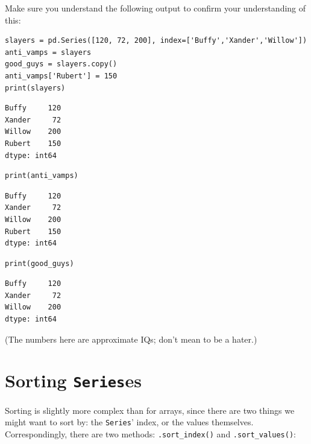 Make sure you understand the following output to confirm your understanding of
this:


\begin{Verbatim}[fontsize=\scriptsize,samepage=true,frame=single,framesep=3mm]
slayers = pd.Series([120, 72, 200], index=['Buffy','Xander','Willow'])
anti_vamps = slayers
good_guys = slayers.copy()
anti_vamps['Rubert'] = 150
print(slayers)
\end{Verbatim}
\vspace{-.3in}

\begin{Verbatim}[fontsize=\scriptsize,samepage=true,frame=leftline,framesep=5mm,framerule=1mm]
Buffy     120
Xander     72
Willow    200
Rubert    150
dtype: int64
\end{Verbatim}

\begin{Verbatim}[fontsize=\scriptsize,samepage=true,frame=single,framesep=3mm]
print(anti_vamps)
\end{Verbatim}
\vspace{-.3in}

\begin{Verbatim}[fontsize=\scriptsize,samepage=true,frame=leftline,framesep=5mm,framerule=1mm]
Buffy     120
Xander     72
Willow    200
Rubert    150
dtype: int64
\end{Verbatim}

\begin{Verbatim}[fontsize=\scriptsize,samepage=true,frame=single,framesep=3mm]
print(good_guys)
\end{Verbatim}
\vspace{-.3in}

\begin{Verbatim}[fontsize=\scriptsize,samepage=true,frame=leftline,framesep=5mm,framerule=1mm]
Buffy     120
Xander     72
Willow    200
dtype: int64
\end{Verbatim}

(The numbers here are approximate IQs; don't mean to be a hater.)


\section{Sorting \texttt{Series}es}

Sorting is slightly more complex than for arrays, since there are two things we
might want to sort by: the \texttt{Series}' index, or the values themselves.
Correspondingly, there are two methods: \texttt{.sort\_index()} and
\texttt{.sort\_values()}:

